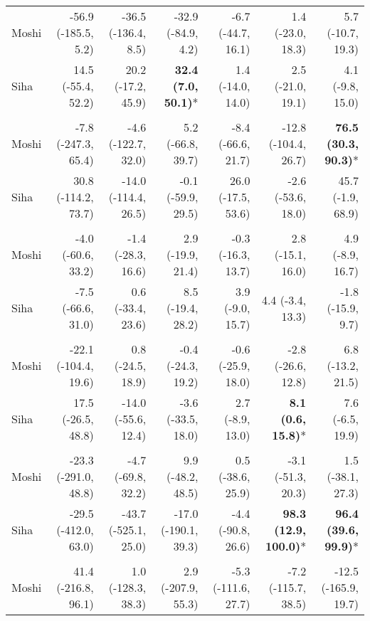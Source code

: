 \begin{table}[t]
\begin{tabular*}{\linewidth}{@{\extracolsep{\fill}}l|rrrrrr}
Moshi & -56.9 (-185.5, 5.2) & -36.5 (-136.4, 8.5) & -32.9 (-84.9, 4.2) & -6.7 (-44.7, 16.1) & 1.4 (-23.0, 18.3) & 5.7 (-10.7, 19.3) \\ 
Siha & 14.5 (-55.4, 52.2) & 20.2 (-17.2, 45.9) & \textbf{32.4 (7.0, 50.1)}* & 1.4 (-14.0, 14.0) & 2.5 (-21.0, 19.1) & 4.1 (-9.8, 15.0) \\ 
\midrule\addlinespace[2.5pt]
\multicolumn{7}{l}{Substance Abuse} \\[2.5pt] 
\midrule\addlinespace[2.5pt]
Moshi & -7.8 (-247.3, 65.4) & -4.6 (-122.7, 32.0) & 5.2 (-66.8, 39.7) & -8.4 (-66.6, 21.7) & -12.8 (-104.4, 26.7) & \textbf{76.5 (30.3, 90.3)}* \\ 
Siha & 30.8 (-114.2, 73.7) & -14.0 (-114.4, 26.5) & -0.1 (-59.9, 29.5) & 26.0 (-17.5, 53.6) & -2.6 (-53.6, 18.0) & 45.7 (-1.9, 68.9) \\ 
\midrule\addlinespace[2.5pt]
\multicolumn{7}{l}{Fractures} \\[2.5pt] 
\midrule\addlinespace[2.5pt]
Moshi & -4.0 (-60.6, 33.2) & -1.4 (-28.3, 16.6) & 2.9 (-19.9, 21.4) & -0.3 (-16.3, 13.7) & 2.8 (-15.1, 16.0) & 4.9 (-8.9, 16.7) \\ 
Siha & -7.5 (-66.6, 31.0) & 0.6 (-33.4, 23.6) & 8.5 (-19.4, 28.2) & 3.9 (-9.0, 15.7) & 4.4 (-3.4, 13.3) & -1.8 (-15.9, 9.7) \\ 
\midrule\addlinespace[2.5pt]
\multicolumn{7}{l}{Road Traffic Accidents} \\[2.5pt] 
\midrule\addlinespace[2.5pt]
Moshi & -22.1 (-104.4, 19.6) & 0.8 (-24.5, 18.9) & -0.4 (-24.3, 19.2) & -0.6 (-25.9, 18.0) & -2.8 (-26.6, 12.8) & 6.8 (-13.2, 21.5) \\ 
Siha & 17.5 (-26.5, 48.8) & -14.0 (-55.6, 12.4) & -3.6 (-33.5, 18.0) & 2.7 (-8.9, 13.0) & \textbf{8.1 (0.6, 15.8)}* & 7.6 (-6.5, 19.9) \\ 
\midrule\addlinespace[2.5pt]
\multicolumn{7}{l}{Typhoid} \\[2.5pt] 
\midrule\addlinespace[2.5pt]
Moshi & -23.3 (-291.0, 48.8) & -4.7 (-69.8, 32.2) & 9.9 (-48.2, 48.5) & 0.5 (-38.6, 25.9) & -3.1 (-51.3, 20.3) & 1.5 (-38.1, 27.3) \\ 
Siha & -29.5 (-412.0, 63.0) & -43.7 (-525.1, 25.0) & -17.0 (-190.1, 39.3) & -4.4 (-90.8, 26.6) & \textbf{98.3 (12.9, 100.0)}* & \textbf{96.4 (39.6, 99.9)}* \\ 
\midrule\addlinespace[2.5pt]
\multicolumn{7}{l}{Leprosy} \\[2.5pt] 
\midrule\addlinespace[2.5pt]
Moshi & 41.4 (-216.8, 96.1) & 1.0 (-128.3, 38.3) & 2.9 (-207.9, 55.3) & -5.3 (-111.6, 27.7) & -7.2 (-115.7, 38.5) & -12.5 (-165.9, 19.7) \\ 

\end{tabular*}
\end{table}
